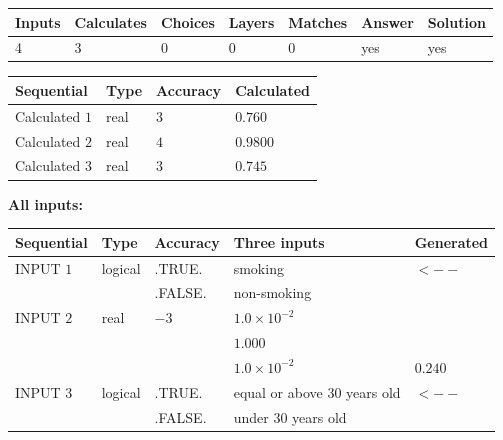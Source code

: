 \documentclass[12pt]{article}
\begin{document}
 
\vspace{0.3in}
   
   
   
   
\noindent\begin{tabular}{|l|l|l|l|l|l|l|}
 \hline
Inputs & Calculates & Choices & Layers & Matches & Answer & Solution \\ \hline
           4  & 
           3  & 
           0
  & 
           0  & 
           0  & 
  yes & 
  yes 
  \\ \hline
 \end{tabular}
   
   
   
   
\noindent{}
   
   
  
  
\noindent\begin{tabular}{|l|l|l|l|}
\hline
 Sequential & Type & Accuracy & Calculated \\ 
\hline
 
 
  Calculated $            1 $ & real & $            3  $ & 
 $ 0.760 $ 
 \\  \hline  
 
 
  Calculated $            2 $ & real & $            4  $ & 
 $ 0.9800 $ 
 \\  \hline  
 
 
  Calculated $            3 $ & real & $            3  $ & 
 $ 0.745 $ 
 \\  \hline  
 \end{tabular}
   
   
   
   
\noindent\vspace{0.1in}\hspace{-0.08in} {\textbf{\Large{All inputs: }}}
   
   
  
  
\noindent\begin{tabular}{|l|l|l|l|l|}
\hline
 Sequential & Type & Accuracy & Three inputs & Generated \\ 
\hline
 
 
  INPUT $            1 $ & logical & .TRUE. & 
 smoking & 
  $ <-- $ 
  \\
  & & .FALSE. & 
  non-smoking & 
 \\  \hline  
 
 
  INPUT $            2 $ & real & $           -3  $ & $
 1.0 \times 10^{-2}
  $ & \\
  & & &  $
 1.000
  $ & \\
  & & &  $
 1.0 \times 10^{-2}
 $ & $ 0.240 $ 
 \\  \hline  
 
 
  INPUT $            3 $ & logical & .TRUE. & 
 equal or above 30 years old & 
  $ <-- $ 
  \\
  & & .FALSE. & 
  under 30 years old & 
 \\  \hline  
 \end{tabular}
   
\end{document}
